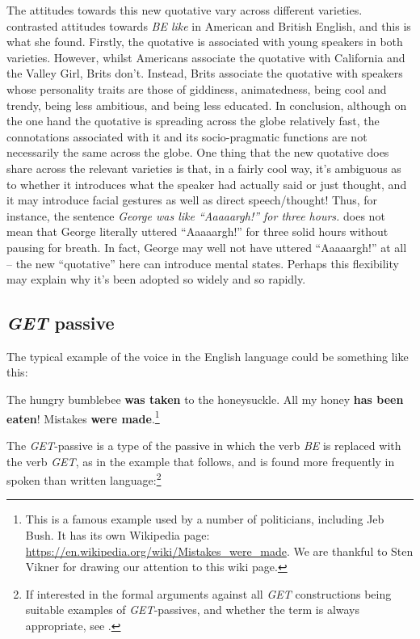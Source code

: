 The attitudes towards this new quotative vary across different varieties. \citet{Buchstaller2006} contrasted attitudes towards \emph{BE like} in American and British English, and this is what she found. Firstly, the quotative is associated with young speakers in both varieties. However, whilst Americans associate the quotative with California and the Valley Girl, Brits don't. Instead, Brits associate the quotative with speakers whose personality traits are those of giddiness, animatedness, being cool and trendy, being less ambitious, and being less educated. In conclusion, although on the one hand the quotative is spreading across the globe relatively fast, the connotations associated with it and its socio-pragmatic functions are not necessarily the same across the globe. One thing that the new quotative does share across the relevant varieties is that, in a fairly cool way, it's ambiguous as to whether it introduces what the speaker had actually said or just thought, and it may introduce facial gestures as well as direct speech/thought! Thus, for instance, the sentence \textit{George was like ``Aaaaargh!'' for three hours.} does not mean that George literally uttered ``Aaaaargh!'' for three solid hours without pausing for breath. In fact, George may well not have uttered ``Aaaaargh!'' at all -- the new ``quotative'' here can introduce mental states. Perhaps this flexibility may explain why it's been adopted so widely and so rapidly.

\subsection{\textit{GET} passive}\label{get-passive}
The typical example of the  voice in the English language could be something like this:
\begin{exe}
    \ex The hungry bumblebee \textbf{was taken} to the honeysuckle. 
    \ex All my honey \textbf{has been eaten}! 
    \ex Mistakes \textbf{were made}.\footnote{This is a famous example used by a number of politicians, including Jeb Bush. It has its own Wikipedia page: \url{https://en.wikipedia.org/wiki/Mistakes_were_made}. We are thankful to Sten Vikner for drawing our attention to this wiki page.}
\end{exe}

\noindent The \emph{GET}-passive is a type of the passive in which the verb \emph{BE} is replaced with the verb \emph{GET}, as in the example that follows, and is found more frequently in spoken than written language:\footnote{If interested in the formal arguments against all \emph{GET} constructions being suitable examples of \emph{GET}-passives, and whether the term  is always appropriate, see \citet{MitkovskaBužarovska2012}.}

